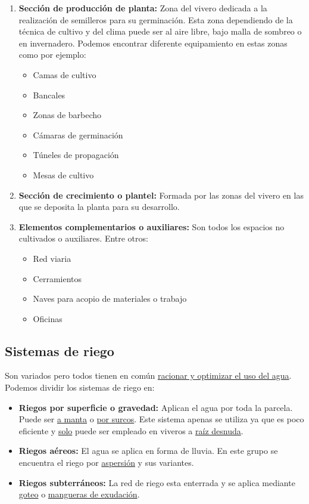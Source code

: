\documentclass[a4paper,12pt,oneside]{article}
\begin{document}
\begin{enumerate}
\item \textbf{Sección de producción de planta:} Zona del vivero dedicada a la realización de
semilleros para su germinación. Esta zona dependiendo de la técnica de
cultivo y del clima puede ser al aire libre, bajo malla de sombreo o en
invernadero. Podemos encontrar diferente equipamiento en estas zonas como por
ejemplo:\\
\begin{itemize}
\item Camas de cultivo
\item Bancales
\item Zonas de barbecho
\item Cámaras de germinación
\item Túneles de propagación
\item Mesas de cultivo
\end{itemize}
\item \textbf{Sección de crecimiento o plantel:} Formada por las zonas del vivero en las
que se deposita la planta para su desarrollo.
\item \textbf{Elementos complementarios o auxiliares:} Son todos los espacios no
cultivados o auxiliares. Entre otros: 
\begin{itemize}
\item Red viaria
\item Cerramientos
\item Naves para acopio de materiales o trabajo
\item Oficinas
\end{itemize}
\end{enumerate}
\subsection{Sistemas de riego}
\label{sec:orgd1251b6}
Son variados pero todos tienen en común \uline{racionar y optimizar el uso del
agua}. Podemos dividir los sistemas de riego en:\\
\begin{itemize}
\item \textbf{Riegos por superficie o gravedad:} Aplican el agua por toda la parcela. Puede
ser \uline{a manta} o \uline{por surcos}. Este sistema apenas se utiliza ya que es poco
eficiente y \uline{solo} puede ser empleado en viveros a \uline{raíz desnuda}.
\item \textbf{Riegos aéreos:} El agua se aplica en forma de lluvia. En este grupo se
encuentra el riego por \uline{aspersión} y sus variantes.
\item \textbf{Riegos subterráneos:} La red de riego esta enterrada y se aplica mediante
\uline{goteo} o \uline{mangueras de exudación}.
\end{itemize}
\end{document}
